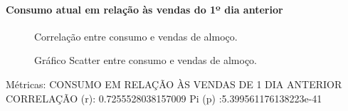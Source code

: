 \documentclass[	12pt, Times, openright, twoside, a4paper, english, brazil]{abntex2}
\begin{document}
    	        \paragraph{Consumo atual em relação às vendas do 1º dia anterior}
    	            \begin{figure}[!ht]
                    	\caption{Correlação entre consumo e vendas de almoço. \label{fig:case1_consumo_vendas_almoco} }
                    \end{figure}
                    \begin{figure}[!ht]
                    	\caption{Gráfico Scatter entre consumo e vendas de almoço. \label{fig:case1_scatter_consumo_vendas_almoco} }
                    \end{figure}
                    Métricas:\newline
                    CONSUMO EM RELAÇÃO ÀS VENDAS DE 1 DIA ANTERIOR\newline
                    CORRELAÇÃO (r): 0.7255528038157009\newline
                    Pi (p) :5.399561176138223e-41\newline
\end{document}
